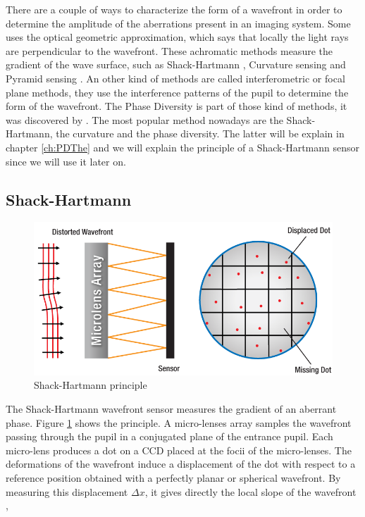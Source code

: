 There are a couple of ways to characterize the form of a wavefront in order to determine the amplitude of the aberrations present in an imaging system. Some uses the optical geometric approximation, which says that locally the light rays are perpendicular to the wavefront. These achromatic methods measure the gradient of the wave surface, such as Shack-Hartmann \citep{hartmann1900,ShackPlatt_1971,fontanella1985}, Curvature sensing \citep{Roddier1988} and Pyramid sensing \citep{ragazzoni1996}. An other kind of methods are called interferometric or focal plane methods, they use the interference patterns of the pupil to determine the form of the wavefront. The Phase Diversity is part of those kind of methods, it was discovered by \citet{Gonsalves_1982}. The most popular method nowadays are the Shack-Hartmann, the curvature and the phase diversity. The latter will be explain in chapter \ref{ch:PDThe} and we will explain the principle of a Shack-Hartmann sensor since we will use it later on.


\subsection[Shack-Hartmann]{Shack-Hartmann \citep{hartmann1900,ShackPlatt_1971}}
\label{subsec:SHprinciple}

\begin{figure}
\begin{center}
\includegraphics[width=\textwidth,angle=0]{Figures/SHWFSPrinciple}
\decoRule
\caption[Shack-Hartmann principle]{Shack-Hartmann principle \citep{SHWFS}}
\label{fig:SHWFSPrinciple}
\end{center}
\end{figure}

The Shack-Hartmann wavefront sensor measures the gradient of an aberrant phase. Figure \ref{fig:SHWFSPrinciple} shows the principle. A micro-lenses array samples the wavefront passing through the pupil in a conjugated plane of the entrance pupil. Each micro-lens produces a dot on a CCD placed at the focii of the micro-lenses. The deformations of the wavefront induce a displacement of the dot with respect to a reference position obtained with a perfectly planar or spherical wavefront. By measuring this displacement $\Delta x$, it gives directly the local slope of the wavefront \citep{fontanella1985},

